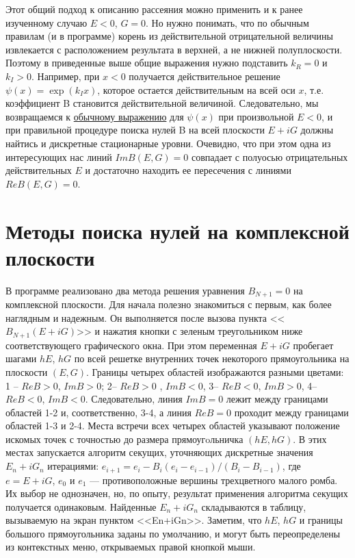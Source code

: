 \documentclass[12pt]{article}
\begin{document}
Этот общий подход к описанию рассеяния можно применить и к ранее изученному случаю $E<0$, $G=0$.
Но нужно понимать, что по обычным правилам (и в программе) корень из действительной отрицательной величины
извлекается с расположением результата в верхней, а не нижней полуплоскости.
Поэтому в приведенные выше общие выражения нужно подставить $k_R = 0$ и $k_I >0$. Например,
при $x<0$ получается  действительное решение $\psi(x)=\exp(k_Ix)$, которое остается действительным на всей оси $x$,
т.е. коэффициент B становится действительной величиной. Следовательно, мы возвращаемся к \hyperlink{main_model} {обычному выражению} для  $\psi(x)$ при произвольной $E<0$, и при правильной процедуре поиска нулей B на всей плоскости $E+iG$  должны найтись и
дискретные стационарные уровни. Очевидно, что при этом одна из интересующих нас линий $Im B(E,G)=0$ совпадает с полуосью
отрицательных действительных $E$ и достаточно находить ее пересечения с линиями $Re B(E,G)=0$.

\hypertarget{Bquasi}{}\section{Методы поиска нулей на комплексной плоскости}
В программе реализовано два метода  решения уравнения $B_{N+1}=0$ на комплексной плоскости.
Для начала полезно знакомиться с первым, как более наглядным и надежным. Он выполняется после вызова пункта
<<$B_{N+1}(E+iG)$>> и нажатия кнопки с зеленым треугольником ниже соответствующего графического окна.
При этом переменная $E+iG$ пробегает шагами $hE$, $hG$ по всей решетке внутренних точек некоторого
прямоугольника на плоскости $(E,G)$.  Границы четырех областей изображаются разными цветами:
1 -- $Re B>0$, $Im B>0$; 2-- $Re B>0$ , $Im B<0$, 3-- $Re B<0$, $Im B>0$, 4-- $Re B<0$, $Im B<0$. Следовательно,
линия $Im B=0$ лежит между границами областей 1-2 и, соответственно, 3-4, а линия $Re B=0$ проходит
между границами областей 1-3 и 2-4. Места встречи всех четырех областей указывают положение искомых точек
с точностью до размера прямоугoльничка $(hE,hG)$. В этих местах запускается алгоритм секущих, уточняющих
дискретные значения $E_n+iG_n$ итерациями: $e_{i+1}=e_i-B_i(e_i-e_{i-1})/(B_i-B_{i-1})$, где $e=E+iG$, $e_0$ и $e_1$ ---
противоположные вершины трехцветного малого ромба. Их выбор не однозначен, но, по опыту, результат применения
алгоритма секущих получается одинаковым. Найденные $E_n+iG_n$ складываются в таблицу, вызываемую на экран пунктом
<<En+iGn>>. Заметим, что $hE$, $hG$ и границы большого прямоугольника заданы по умолчанию, и могут быть
переопределены из контекстных меню, открываемых правой кнопкой мыши.
\end{document}
